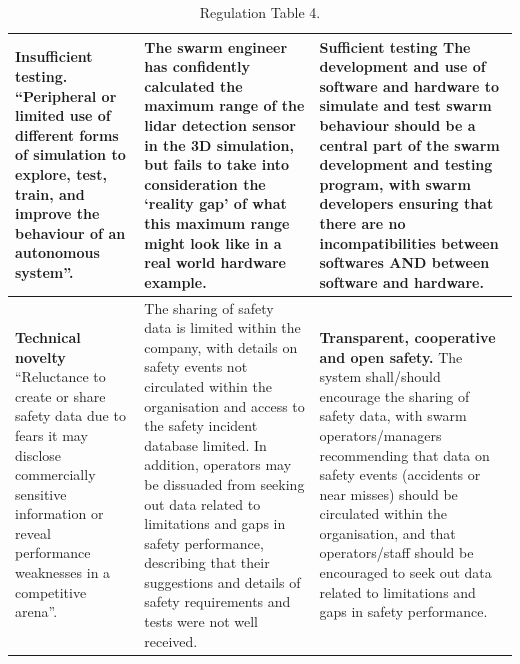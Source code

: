 \documentclass[lettersize,journal]{IEEEtran}
\begin{document}
\begin{landscape}
\begin{table}[]
\begin{tabular}{|p{0.3\textheight}|p{0.35\textheight}|p{0.35\textheight}|}
         \hline
         \textbf{Insufficient testing.} ``Peripheral or limited use of different forms of simulation to explore, test, train, and improve the behaviour of an autonomous system”. \cite{macrae2021learning} & The swarm engineer has confidently calculated the maximum range of the lidar detection sensor in the 3D simulation, but fails to take into consideration the ‘reality gap’ of what this maximum range might look like in a real world hardware example. & \textbf{Sufficient testing} The development and use of software and hardware to simulate and test swarm behaviour should be a central part of the swarm development and testing program, with swarm developers ensuring that there are no incompatibilities between softwares AND between software and hardware. \\
         \hline
         \textbf{Technical novelty} ``Reluctance to create or share safety data due to fears it may disclose commercially sensitive information or reveal performance weaknesses in a competitive arena”. \cite{macrae2021learning} & The sharing of safety data is limited within the company, with details on safety events not circulated within the organisation and access to the safety incident database limited. In addition, operators may be dissuaded from seeking out data related to limitations and gaps in safety performance, describing that their suggestions and details of safety requirements and tests were not well received. & \textbf{Transparent, cooperative and open safety.} The system shall/should encourage the sharing of safety data, with swarm operators/managers recommending that data on safety events (accidents or near misses) should be circulated within the organisation, and that operators/staff should be encouraged to seek out data related to limitations and gaps in safety performance.\\
         \hline
    \end{tabular}
    \caption{Regulation Table 4.}
    \label{tab:reg_4}
\end{table}
\end{landscape}
\end{document}
